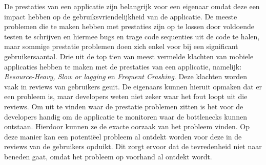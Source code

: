 De prestaties van een applicatie zijn belangrijk voor een eigenaar omdat deze een impact hebben op de gebruiksvriendelijkheid van de applicatie. De meeste problemen die te maken hebben met prestaties zijn op te lossen door voldoende testen te schrijven en hiermee bugs en trage code sequenties uit de code te halen, maar sommige prestatie problemen doen zich enkel voor bij een significant gebruikersaantal. Drie uit de top tien van meest vermelde klachten van mobiele applicaties hebben te maken met de prestaties van een applicatie, namelijk: \textit{Resource-Heavy, Slow or lagging} en \textit{Frequent Crashing}. Deze klachten worden vaak in reviews van gebruikers geuit. De eigenaars kunnen hieruit opmaken dat er een probleem is, maar developers weten niet zeker waar het fout loopt uit die reviews. Om uit te vinden waar de prestatie problemen zitten is het voor de developers handig om de applicatie te monitoren waar de bottlenecks kunnen ontstaan. Hierdoor kunnen ze de exacte oorzaak van het probleem vinden. Op deze manier kan een potenti\"eel probleem al ontdekt worden voor deze in de reviews van de gebruikers opduikt. Dit zorgt ervoor dat de tevredenheid niet naar beneden gaat, omdat het probleem op voorhand al ontdekt wordt. \\


